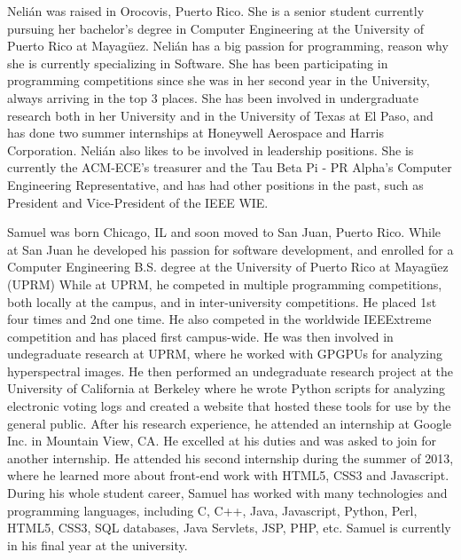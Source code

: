 \label{sec:bios}


Nelián was raised in Orocovis, Puerto Rico. She is a senior
student currently pursuing her bachelor's degree in Computer Engineering at the
University of Puerto Rico at Mayagüez. Nelián has a big passion for programming,
reason why she is currently specializing in Software. She
has been participating in programming competitions since she was in her second
year in the University, always arriving in the top 3 places. She has been involved in
undergraduate research both in her University and in the University of Texas at
El Paso,  and has done two summer internships at
Honeywell Aerospace and Harris Corporation. Nelián also likes to be
involved in leadership positions.  She is currently the ACM-ECE's treasurer and
the Tau Beta Pi - PR Alpha's Computer Engineering Representative, and has had
other positions in the past, such as President and Vice-President of the IEEE
WIE.


Samuel was born Chicago, IL and soon moved to San Juan, Puerto Rico. While at
San Juan he developed his passion for software development, and enrolled for a
Computer Engineering B.S. degree at the University of Puerto Rico at Mayagüez
(UPRM) While at UPRM, he competed in multiple programming competitions, both
locally at the campus, and in inter-university competitions. He placed 1st four
times and 2nd one time. He also competed in the worldwide IEEExtreme competition
and has placed first campus-wide. He was then involved in undegraduate research
at UPRM, where he worked with GPGPUs for analyzing hyperspectral images. He then
performed an undegraduate research project at the University of California at
Berkeley where he wrote Python scripts for analyzing electronic voting logs and
created a website that hosted these tools for use by the general public. After
his research experience, he attended an internship at Google Inc. in Mountain
View, CA. He excelled at his duties and was asked to join for another
internship. He attended his second internship during the summer of 2013, where
he learned more about front-end work with HTML5, CSS3 and Javascript. During his
whole student career, Samuel has worked with many technologies and programming
languages, including C, C++, Java, Javascript, Python, Perl, HTML5, CSS3, SQL
databases, Java Servlets, JSP, PHP, etc. Samuel is currently in his final year
at the university.

